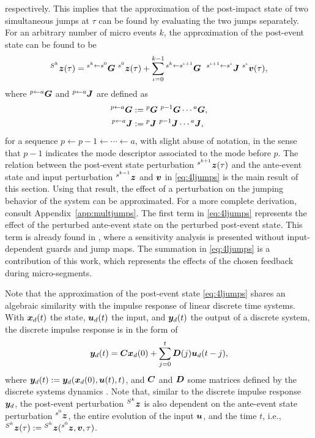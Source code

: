 \documentclass[../DC2017114Bouma.tex]{subfiles}
\begin{document}
respectively. This implies that the approximation of the post-impact state of two simultaneous jumps at $\tau$ can be found by evaluating the two jumps separately. For an arbitrary number of micro events $k$, the approximation of the post-event state can be found to be
\begin{align}
\ls^{S^k}\zb(\tau) = \ls^{s^k\leftarrow s^0}\Gb\ \ls^{s^0}\zb(\tau) + \sum_{\iota=0}^{k-1}\ls^{s^{k}\leftarrow s^{\iota+1}}\Gb\ \ ^{s^{\iota+1}\leftarrow s^{\iota}}\Jb\ \ls^{s^{\iota}}\vb(\tau),\label{eq:4ljumps}
\end{align}
where $\hspace{0cm}^{p\leftarrow a}{\boldsymbol{G}}$ and $\hspace{0cm}^{p\leftarrow a}{\boldsymbol{J}}$ are defined as
\begin{align}
\ls^{p\leftarrow a}\Gb &:= \ls^{p}\Gb\ \ls^{p-1}\Gb\cdots\ls^{a}\Gb,\\
\ls^{p\leftarrow a}\Jb &:= \ls^{p}\Jb\ \ls^{p-1}\Jb\cdots\ls^{a}\Jb,
\end{align}
for a sequence $p\leftarrow p-1 \leftarrow \cdots \leftarrow a$, with slight abuse of notation, in the sense that $p-1$ indicates the mode descriptor associated to the mode before $p$. The relation between the post-event state perturbation $\hspace{0cm}^{s^{k+1}}{\boldsymbol{z}}(\tau)$ and the ante-event state and input perturbation $\hspace{0cm}^{s^{k-1}}{\boldsymbol{z}}$ and ${\boldsymbol{v}}$ in \eqref{eq:4ljumps} is the main result of this section. Using that result, the effect of a perturbation on the jumping behavior of the system can be approximated. For a more complete derivation, consult Appendix~\ref{app:multjumps}. The first term in \eqref{eq:4ljumps} represents the effect of the perturbed ante-event state on the perturbed post-event state. This term is already found in \cite{Rijnen2018}, where a sensitivity analysis is presented without input-dependent guards and jump maps. The summation in \eqref{eq:4ljumps} is a contribution of this work, which represents the effects of the chosen feedback during micro-segments.

Note that the approximation of the post-event state \eqref{eq:4ljumps} shares an algebraic similarity with the impulse response of linear discrete time systems. With ${\boldsymbol{x}}_d(t)$ the state, ${\boldsymbol{u}}_d(t)$ the input, and ${\boldsymbol{y}}_d(t)$ the output of a discrete system, the discrete impulse response is in the form of
\begin{align}
{\boldsymbol{y}}_d(t) = {\boldsymbol{C}}{\boldsymbol{x}}_d(0) + \sum_{j=0}^t{\boldsymbol{D}}(j){\boldsymbol{u}}_d(t-j),
\end{align}
where ${\boldsymbol{y}}_d(t) :=  {\boldsymbol{y}}_d({\boldsymbol{x}}_d(0),{\boldsymbol{u}}(t),t)$, and ${\boldsymbol{C}}$ and ${\boldsymbol{D}}$ some matrices defined by the discrete systems dynamics \cite{Hespanha2009}. Note that, similar to the discrete impulse response ${\boldsymbol{y}}_d$, the post-event perturbation $\hspace{0cm}^{S^k}{\boldsymbol{z}}$ is also dependent on the ante-event state perturbation $\hspace{0cm}^{s^0}{\boldsymbol{z}}$, the entire evolution of the input ${\boldsymbol{u}}$, and the time $t$, i.e., $\hspace{0cm}^{S^k}{\boldsymbol{z}}(\tau) := \hspace{0cm}^{S^k}{\boldsymbol{z}}(\hspace{0cm}^{s^0}{\boldsymbol{z}},{\boldsymbol{v}},\tau)$.
\end{document}
